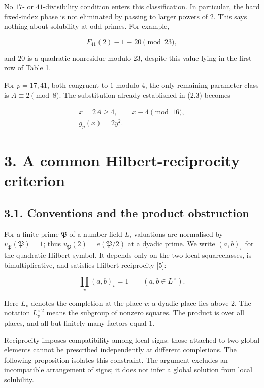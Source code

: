 \documentclass[11pt,a4paper]{article}
\begin{document}
No \(17\)- or \(41\)-divisibility condition enters this classification.
In particular, the hard fixed-index phase is not eliminated by passing
to larger powers of \(2\). This says nothing about solubility at odd
primes. For example,

\[
F_{41}(2)-1\equiv20\pmod{23},
\]

and \(20\) is a quadratic nonresidue modulo \(23\), despite this value
lying in the first row of Table 1.

For \(p=17,41\), both congruent to \(1\) modulo \(4\), the only
remaining parameter class is \(A\equiv2\pmod8\). The substitution
already established in (2.3) becomes

\[
\begin{gathered}
x=2A\ge4,\qquad x\equiv4\pmod{16},\\
g_p(x)=2y^2.
\end{gathered}
\tag{2.10}
\]

\section{3. A common Hilbert-reciprocity criterion}\label{criterion}

\subsection{3.1. Conventions and the product
obstruction}\label{local-global}

For a finite prime \(\mathfrak P\) of a number field \(L\), valuations
are normalised by \(v_{\mathfrak P}(\mathfrak P)=1\); thus
\(v_{\mathfrak P}(2)=e(\mathfrak P/2)\) at a dyadic prime. We write
\((a,b)_v\) for the quadratic Hilbert symbol. It depends only on the two
local squareclasses, is bimultiplicative, and satisfies Hilbert
reciprocity {[}5{]}:

\[
\prod_v(a,b)_v=1
\qquad(a,b\in L^\times).
\tag{3.1}
\]

Here \(L_v\) denotes the completion at the place \(v\); a dyadic place
lies above \(2\). The notation \(L_v^{\times2}\) means the subgroup of
nonzero squares. The product is over all places, and all but finitely
many factors equal \(1\).

Reciprocity imposes compatibility among local signs: those attached to
two global elements cannot be prescribed independently at different
completions. The following proposition isolates this constraint. The
argument excludes an incompatible arrangement of signs; it does not
infer a global solution from local solubility.
\end{document}
